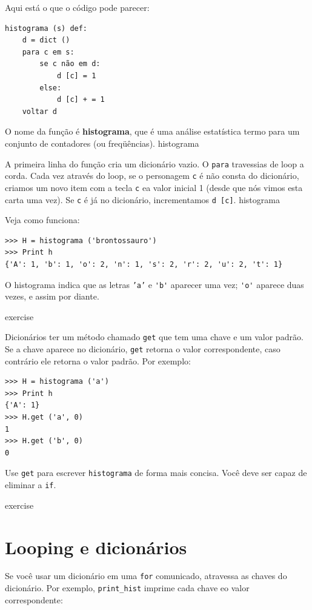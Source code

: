 \documentclass[10pt]{book}
\begin{document}
\begin{exercise}
Aqui está o que o código pode parecer:

\begin{verbatim}
histograma (s) def:
    d = dict ()
    para c em s:
        se c não em d:
            d [c] = 1
        else:
            d [c] + = 1
    voltar d
\end{verbatim}
%
O nome da função é {\bf histograma}, que é uma análise estatística
termo para um conjunto de contadores (ou freqüências).
\index{} histograma

A primeira linha do
função cria um dicionário vazio. O {\tt para} travessias de loop
a corda. Cada vez através do loop, se o personagem {\tt c} é
não consta do dicionário, criamos um novo item com a tecla {\tt c} ea
valor inicial 1 (desde que nós vimos esta carta uma vez). Se {\tt c} é
já no dicionário, incrementamos {\tt d [c]}.
\index{} histograma

Veja como funciona:

\begin{verbatim}
>>> H = histograma ('brontossauro')
>>> Print h
{'A': 1, 'b': 1, 'o': 2, 'n': 1, 's': 2, 'r': 2, 'u': 2, 't': 1}
\end{verbatim}
%
O histograma indica que as letras {\tt 'a'} e \verb "'b'"
aparecer uma vez; \verb "'o'" aparece duas vezes, e assim por diante.

\begin{} exercise

Dicionários ter um método chamado {\tt get} que tem uma chave
e um valor padrão. Se a chave aparece no dicionário,
{\tt get} retorna o valor correspondente, caso contrário ele retorna
o valor padrão. Por exemplo:

\begin{verbatim}
>>> H = histograma ('a')
>>> Print h
{'A': 1}
>>> H.get ('a', 0)
1
>>> H.get ('b', 0)
0
\end{verbatim}
%
Use {\tt get} para escrever {\tt histograma} de forma mais concisa. Você
deve ser capaz de eliminar a {\tt if}.
\end{} exercise


\section{Looping e dicionários}

Se você usar um dicionário em uma {\tt for} comunicado, atravessa
as chaves do dicionário. Por exemplo, \verb "print_hist"
imprime cada chave eo valor correspondente:


\end{exercise}
\end{document}
